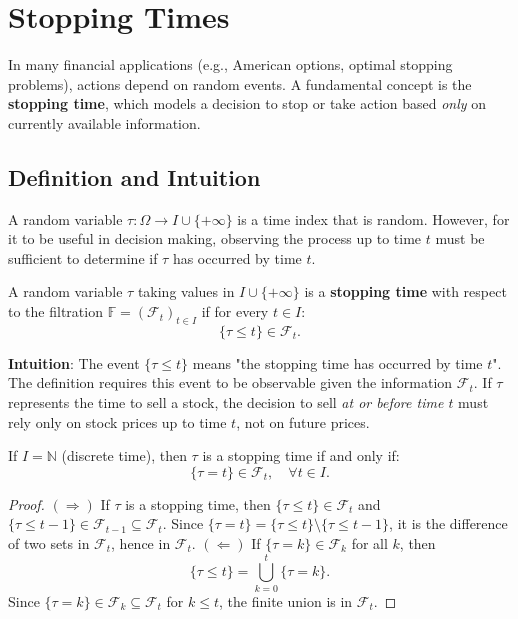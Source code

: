\chapter{Stopping Times}

In many financial applications (e.g., American options, optimal stopping problems), actions depend on random events. A fundamental concept is the \textbf{stopping time}, which models a decision to stop or take action based \textit{only} on currently available information.

\section{Definition and Intuition}

A random variable $\tau : \Omega \to I \cup \{+\infty\}$ is a time index that is random. However, for it to be useful in decision making, observing the process up to time $t$ must be sufficient to determine if $\tau$ has occurred by time $t$.

\begin{definition}
A random variable $\tau$ taking values in $I \cup \{+\infty\}$ is a \textbf{stopping time} with respect to the filtration $\mathbb{F} = (\mathcal{F}_t)_{t \in I}$ if for every $t \in I$:
\[
\{\tau \le t\} \in \mathcal{F}_t.
\]
\end{definition}

\textbf{Intuition}: The event $\{\tau \le t\}$ means "the stopping time has occurred by time $t$". The definition requires this event to be observable given the information $\mathcal{F}_t$.
If $\tau$ represents the time to sell a stock, the decision to sell \textit{at or before time $t$} must rely only on stock prices up to time $t$, not on future prices.

\begin{proposition}
If $I = \mathbb{N}$ (discrete time), then $\tau$ is a stopping time if and only if:
\[
\{\tau = t\} \in \mathcal{F}_t, \quad \forall t \in I.
\]
\end{proposition}
\begin{proof}
$(\Rightarrow)$ If $\tau$ is a stopping time, then $\{\tau \le t\} \in \mathcal{F}_t$ and $\{\tau \le t-1\} \in \mathcal{F}_{t-1} \subseteq \mathcal{F}_t$.
Since $\{\tau = t\} = \{\tau \le t\} \setminus \{\tau \le t-1\}$, it is the difference of two sets in $\mathcal{F}_t$, hence in $\mathcal{F}_t$.
$(\Leftarrow)$ If $\{\tau = k\} \in \mathcal{F}_k$ for all $k$, then
\[
\{\tau \le t\} = \bigcup_{k=0}^t \{\tau = k\}.
\]
Since $\{\tau = k\} \in \mathcal{F}_k \subseteq \mathcal{F}_t$ for $k \le t$, the finite union is in $\mathcal{F}_t$.
\end{proof}

